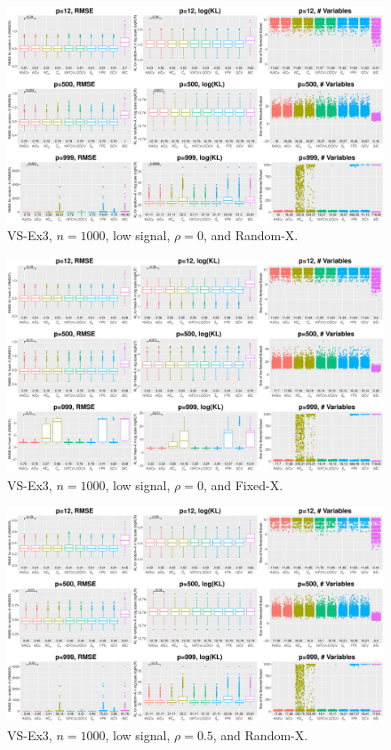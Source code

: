 \clearpage
\begin{figure}[!ht]
\centering
\includegraphics[width=\textwidth]{figures/supplement/randomx_VS-Ex3_n1000_lsnr_rho0.eps}
\caption{VS-Ex3, $n=1000$, low signal, $\rho=0$, and Random-X.}
\end{figure}
\begin{figure}[!ht]
\centering
\includegraphics[width=\textwidth]{figures/supplement/fixedx_VS-Ex3_n1000_lsnr_rho0.eps}
\caption{VS-Ex3, $n=1000$, low signal, $\rho=0$, and Fixed-X.}
\end{figure}
\clearpage
\begin{figure}[!ht]
\centering
\includegraphics[width=\textwidth]{figures/supplement/randomx_VS-Ex3_n1000_lsnr_rho05.eps}
\caption{VS-Ex3, $n=1000$, low signal, $\rho=0.5$, and Random-X.}
\end{figure}
